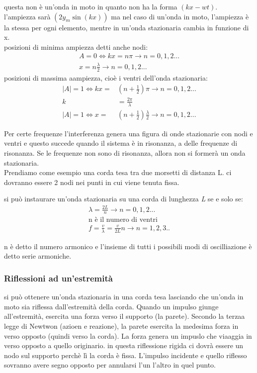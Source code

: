 \documentclass[a4paper,11pt]{article}
\begin{document}
questa non è un'onda in moto in quanto non ha la forma \(\left(kx - wt\right)\).
\\
l'ampiezza sarà \(\left( 2y_m \sin(kx) \right)\) ma nel caso di un'onda in moto, l'ampiezza è la stessa per ogni elemento, mentre in un'onda stazionaria cambia in funzione di x.
\\
posizioni di minima ampiezza detti anche nodi:
\begin{align*}
    A = 0 \Leftrightarrow kx = n\pi \rightarrow n = 0,1,2...
    \\
    x = n \frac{\lambda}{2} \rightarrow n = 0,1,2...
\end{align*}
posizioni di massima aampiezza, cioè i ventri dell'onda stazionaria: 
\begin{align*}
    \left\lvert A \right\rvert = 1 \Leftrightarrow kx =& \left(n + \frac{1}{2}\right) \pi \rightarrow n = 0,1,2...
    \\
    k &= \frac{2\pi}{\lambda}
    \\
    \left\lvert A \right\rvert = 1 \Leftrightarrow x =& \left(n + \frac{1}{2}\right) \frac{\lambda}{2} \rightarrow n = 0,1,2...
\end{align*}

Per certe frequenze l'interferenza genera una figura di onde stazionarie con nodi e ventri e questo succede quando il sistema è in risonanza, a delle frequenze di risonanza. 
Se le frequenze non sono di risonanza, allora non si formerà un onda stazionaria.
\\
Prendiamo come esempio una corda tesa tra due morsetti di distanza L. ci dovranno essere 2 nodi nei punti in cui viene tenuta fissa. 

si può instaurare un'onda stazionaria su una corda di lunghezza \textit{L} se e solo se:
\begin{align*}
    \lambda = \frac{2L}{n} \rightarrow n = 0,1,2...
    \\
    \text{n è il numero di ventri} 
    \\
    f = \frac{v}{\lambda} = \frac{v}{2L} n \rightarrow n = 1,2,3.. 
\end{align*}

n è detto il numero armonico e l'insieme di tutti i possibili modi di oscilliazione è detto serie armoniche. 

\subsubsection{Riflessioni ad un'estremità}
si può ottenere un'onda stazionaria in una corda tesa lasciando che un'onda in moto sia riflessa dall'estremità della corda. Quando un impulso giunge all'estremità, esercita una forza verso il supporto (la parete). Secondo la terzaa legge di Newtwon (azioen e reazione), la parete esercita la medesima forza in verso opposto (quindi verso la corda).
La forza genera un impuslo che viaaggia in verso opposto a quello originario. in questa riflessione rigida ci dovrà essere un nodo sul supporto perchè lì la corda è fissa. L'impulso incidente e quello riflesso sovranno avere segno opposto per annularsi l'un l'altro in quel punto. 
\end{document}
